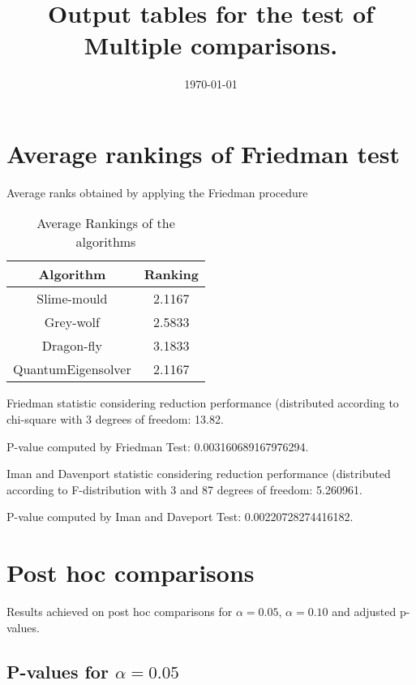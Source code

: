 \documentclass[a4paper,10pt]{article}
\title{Output tables for the test of Multiple comparisons.}
\author{}
\date{\today}
\begin{document}
\begin{landscape}
\pagestyle{empty}
\maketitle
\thispagestyle{empty}
\section{Average rankings of Friedman test}



Average ranks obtained by applying the Friedman procedure

\begin{table}[!htp]
\centering
\begin{tabular}{|c|c|}\hline
Algorithm&Ranking\\\hline
Slime-mould & 2.1167\\
Grey-wolf & 2.5833\\
Dragon-fly & 3.1833\\
QuantumEigensolver & 2.1167\\
\hline
\end{tabular}
\caption{Average Rankings of the algorithms}
\end{table}

Friedman statistic considering reduction performance (distributed according to chi-square with 3 degrees of freedom: 13.82.

P-value computed by Friedman Test: 0.003160689167976294.\newline

Iman and Davenport statistic considering reduction performance (distributed according to F-distribution with 3 and 87 degrees of freedom: 5.260961.

P-value computed by Iman and Daveport Test: 0.00220728274416182.\newline



\pagebreak

\section{Post hoc comparisons}

Results achieved on post hoc comparisons for $\alpha = 0.05$, $\alpha = 0.10$ and adjusted p-values.

\subsection{P-values for $\alpha=0.05$}


\end{landscape}
\end{document}
